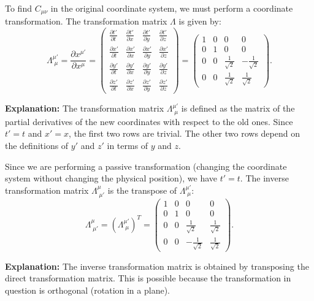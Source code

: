 \documentclass{article}
\begin{document}
To find $C_{\mu\nu}$ in the original coordinate system, we must perform a coordinate transformation. The transformation matrix $\Lambda$ is given by:
\[
\Lambda^{\mu'}_{\;\mu}
= \frac{\partial x^{\mu'}}{\partial x^{\mu}}
=
\begin{pmatrix}
\frac{\partial t'}{\partial t} & \frac{\partial t'}{\partial x} & \frac{\partial t'}{\partial y} & \frac{\partial t'}{\partial z}\\[4pt]
\frac{\partial x'}{\partial t} & \frac{\partial x'}{\partial x} & \frac{\partial x'}{\partial y} & \frac{\partial x'}{\partial z}\\[4pt]
\frac{\partial y'}{\partial t} & \frac{\partial y'}{\partial x} & \frac{\partial y'}{\partial y} & \frac{\partial y'}{\partial z}\\[4pt]
\frac{\partial z'}{\partial t} & \frac{\partial z'}{\partial x} & \frac{\partial z'}{\partial y} & \frac{\partial z'}{\partial z}
\end{pmatrix}
=
\begin{pmatrix}
1 & 0 & 0 & 0\\
0 & 1 & 0 & 0\\
0 & 0 & \tfrac{1}{\sqrt{2}} & -\tfrac{1}{\sqrt{2}}\\
0 & 0 & \tfrac{1}{\sqrt{2}} & \tfrac{1}{\sqrt{2}}
\end{pmatrix}.
\]

\textbf{Explanation:}
The transformation matrix $\Lambda^{\mu'}_{\;\mu}$ is defined as the matrix of the partial derivatives of the new coordinates with respect to the old ones. Since $t' = t$ and $x' = x$, the first two rows are trivial. The other two rows depend on the definitions of $y'$ and $z'$ in terms of $y$ and $z$.

Since we are performing a passive transformation (changing the coordinate system without changing the physical position), we have $t' = t$. The inverse transformation matrix $\Lambda^{\mu}_{\;\mu'}$ is the transpose of $\Lambda^{\mu'}_{\;\mu}$:
\[
\Lambda^{\mu}_{\;\mu'}
= (\Lambda^{\mu'}_{\;\mu})^T
=
\begin{pmatrix}
1 & 0 & 0 & 0\\
0 & 1 & 0 & 0\\
0 & 0 & \tfrac{1}{\sqrt{2}} & \tfrac{1}{\sqrt{2}}\\
0 & 0 & -\tfrac{1}{\sqrt{2}} & \tfrac{1}{\sqrt{2}}
\end{pmatrix}.
\]

\textbf{Explanation:}
The inverse transformation matrix is obtained by transposing the direct transformation matrix. This is possible because the transformation in question is orthogonal (rotation in a plane).
\end{document}
